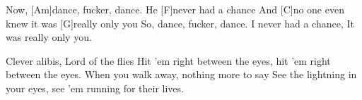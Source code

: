\begin{guitar}
	Now, [Am]dance, fucker, dance. He [F]never had a chance
	And [C]no one even knew it was [G]really only you
	So, dance, fucker, dance. I never had a chance,
	It was really only you.
	
	\begin{highlightbar}
		 
		
		Clever alibis, Lord of the flies
		Hit 'em right between the eyes, hit 'em right between the eyes.
		When you walk away, nothing more to say
		See the lightning in your eyes, see 'em running for their lives.
	\end{highlightbar}
\end{guitar}